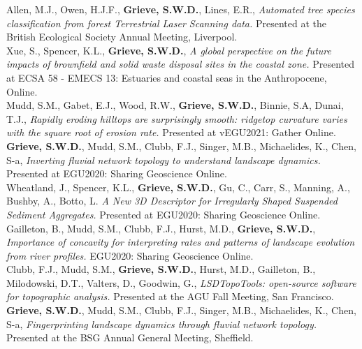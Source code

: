 \documentclass[10pt, a4paper]{article}
\newcommand{\student}{\textbf{\textsuperscript{\textdagger}}}
\newcommand{\years}[1]{\marginnote{\scriptsize #1}}
\begin{document}
\years{2021}Allen, M.J.\student, Owen, H.J.F., \textbf{Grieve, S.W.D.}, Lines, E.R., \textit{Automated tree species classification from forest Terrestrial Laser Scanning data.} Presented at the British Ecological Society Annual Meeting, Liverpool.\\[0.05cm]

\years{2021}Xue, S.\student, Spencer, K.L., \textbf{Grieve, S.W.D.}, \textit{A global perspective on the future impacts of brownfield and solid waste disposal sites in the coastal zone.} Presented at ECSA 58 - EMECS 13: Estuaries and coastal seas in the Anthropocene, Online.\\[0.05cm]

\years{2021}Mudd, S.M., Gabet, E.J., Wood, R.W., \textbf{Grieve, S.W.D.}, Binnie, S.A, Dunai, T.J., \textit{Rapidly eroding hilltops are surprisingly smooth: ridgetop curvature varies with the square root of erosion rate.} Presented at vEGU2021: Gather Online.\\[0.05cm]

\years{2020}\textbf{Grieve, S.W.D.}, Mudd, S.M., Clubb, F.J., Singer, M.B., Michaelides, K., Chen, S-a, \textit{Inverting fluvial network topology to understand landscape dynamics.} Presented at EGU2020: Sharing Geoscience Online.\\[0.05cm]

\years{2020}Wheatland, J., Spencer, K.L., \textbf{Grieve, S.W.D.}, Gu, C., Carr, S., Manning, A., Bushby, A., Botto, L. \textit{A New 3D Descriptor for Irregularly Shaped Suspended Sediment Aggregates.} Presented at EGU2020: Sharing Geoscience Online.\\[0.05cm]

\years{2020}Gailleton, B., Mudd, S.M., Clubb, F.J., Hurst, M.D., \textbf{Grieve, S.W.D.}, \textit{Importance of concavity for interpreting rates and patterns of landscape evolution from river profiles.} EGU2020: Sharing Geoscience Online.\\[0.05cm]

\years{2019}Clubb, F.J., Mudd, S.M., \textbf{Grieve, S.W.D.}, Hurst, M.D., Gailleton, B., Milodowski, D.T., Valters, D., Goodwin, G., \textit{LSDTopoTools: open-source software for topographic analysis.} Presented at the AGU Fall Meeting, San Francisco.\\[0.05cm]

\years{2019}\textbf{Grieve, S.W.D.}, Mudd, S.M., Clubb, F.J., Singer, M.B., Michaelides, K., Chen, S-a, \textit{Fingerprinting landscape dynamics through fluvial network topology.} Presented at the BSG Annual General Meeting, Sheffield.\\[0.05cm]
\end{document}
